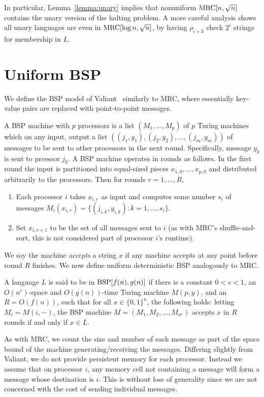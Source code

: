 \documentclass{llncs}
\newcommand{\mrc}{\textup{MRC}}
\newcommand{\bsp}{\textup{BSP}}
\begin{document}
In particular, Lemma~\ref{lemma:unary} implies that nonuniform $\mrc[n,
\sqrt{n}]$ contains the unary version of the halting problem. A more careful
analysis shows all unary languages are even in $\mrc[\log n, \sqrt{n}]$, by
having $\rho_{i+3}$ check $2^i$ strings for membership in $L$.

\section{Uniform BSP}
We define the BSP model of Valiant~\cite{Valiant90} similarly to MRC, where
essentially key-value pairs are replaced with point-to-point messages.

A BSP machine with $p$ processors is a list $(M_1, \dots, M_p)$ of $p$ Turing
machines which on any input, output a list $((j_1, y_1), (j_2, y_2), \dots,
(j_m, y_m))$ of messages to be sent to other processors in the next round.
Specifically, message $y_k$ is sent to prcessor $j_k$. A BSP machine operates
in rounds as follows. In the first round the input is partitioned into
equal-sized pieces $x_{1,0}, \dots, x_{p,0}$ and distributed arbitrarily to the
processors. Then for rounds $r=1, \dots, R$, 

\begin{enumerate}
   \item Each processor $i$ takes $x_{i,r}$ as input and computes some number
$s_i$ of messages $M_i(x_{i,r}) = \{(j_{i,k}, y_{i,k}) : k = 1, \dots, s_i\}$.
   \item Set $x_{i,r+1}$ to be the set of all messages sent to $i$ (as with
MRC's shuffle-and-sort, this is not considered part of processor $i$'s
runtime). 
\end{enumerate} 

We say the machine \emph{accepts} a string $x$ if any machine accepts at any
point before round $R$ finishes. We now define uniform deterministic BSP
analogously to MRC.

\begin{definition}

A language $L$ is said to be in $\bsp[f(n),g(n)]$ if there is a constant $0 < c
< 1$, an $O(n^c)$-space and $O(g(n))$-time Turing machine $M(p, y)$, and an $R
= O(f(n))$, such that for all $x \in \{ 0,1 \}^n$, the following holds: letting
$M_i = M(i, -)$, the BSP machine $M = (M_1, M_2, \dots, M_{n^c})$ accepts $x$
in $R$ rounds if and only if $x \in L$.

\end{definition}

\begin{remark}
As with MRC, we count the size and number of each message as part of the space
bound of the machine generating/receiving the messages. Differing slightly from
Valiant, we do not provide persistent memory for each processor. Instead we
assume that on processor $i$, any memory cell not containing a message will
form a message whose destination is $i$. This is without loss of generality
since we are not concerned with the cost of sending individual messages.
\end{remark}
\end{document}
